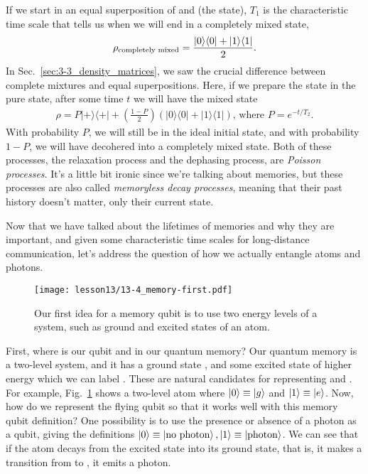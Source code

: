 If we start in an equal superposition of  and  (the \ket{+} state), $T_1$ is the characteristic time scale that tells us when we will end in a completely mixed state,
\begin{equation}
\begin{aligned}
\rho_{\textrm{completely mixed}} =\frac{|0 \rangle \langle 0|+|1 \rangle \langle 1|}{2}.
\end{aligned}
\end{equation}
In Sec.~\ref{sec:3-3_density_matrices}, we saw the crucial difference between complete mixtures and equal superpositions. Here, if we prepare the state in the pure state, after some time $t$ we will have the mixed state
\begin{equation}
\begin{aligned}
\rho=P|+\rangle\langle+|+\left(\frac{1-P}{2}\right)(|0\rangle\langle 0|+| 1\rangle\langle 1|)\text{, where }  P=e^{-t / T_2}.
\end{aligned}
\end{equation}
With probability $P$, we will still be in the ideal initial state, and with probability $1-P$, we will have decohered into a completely mixed state. Both of these processes, the relaxation process and the dephasing process, are \emph{Poisson processes}. It's a little bit ironic since we're talking about memories, but these processes are also called \emph{memoryless decay processes}, meaning that their past history doesn't matter, only their current state.

Now that we have talked about the lifetimes of memories and why they are important, and given some characteristic time scales for long-distance communication, let's address the question of how we actually entangle atoms and photons.

\begin{figure}[t]
    \centering
    \texttt{[image: lesson13/13-4\_memory-first.pdf]}
    \caption[First idea for memory]{Our first idea for a memory qubit is to use two energy levels of a system, such as ground and excited states of an atom.}
    \label{fig:13-memory-first}
\end{figure}

First, where is our qubit  and  in our quantum memory? Our quantum memory is a two-level system, and it has a ground state , and some excited state of higher energy which we can label . These are natural candidates for representing  and . For example, Fig.~\ref{fig:13-memory-first} shows a two-level atom where $\left| 0 \right\rangle\equiv\left| g \right\rangle$ and $\left| 1 \right\rangle\equiv\left| e \right\rangle$. Now, how do we represent the flying qubit so that it works well with this memory qubit definition? One possibility is to use the presence or absence of a photon as a qubit, giving the definitions $\left| 0 \right\rangle\equiv\left| \textrm{no photon} \right\rangle,\left| 1 \right\rangle\equiv\left| \textrm{photon} \right\rangle$.
We can see that if the atom decays from the excited state into its ground state, that is, it makes a transition from  to , it emits a photon.


